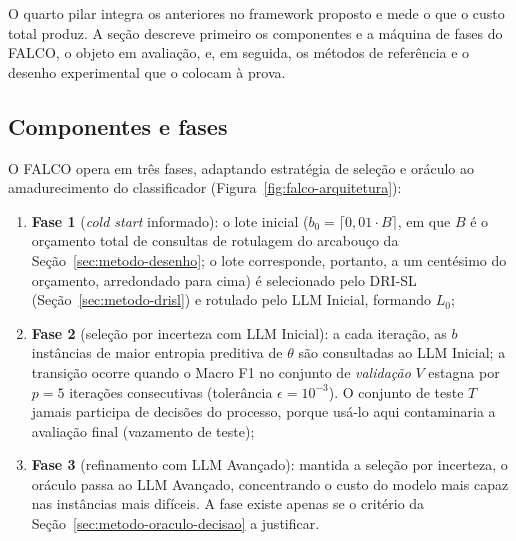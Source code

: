 O quarto pilar integra os anteriores no framework proposto e mede o que o
custo total produz. A seção descreve
primeiro os componentes e a máquina de fases do FALCO, o objeto em
avaliação, e, em seguida, os métodos de referência e o desenho experimental
que o colocam à prova.

\subsection{Componentes e fases}
\label{sec:metodo-falco-fases}

O FALCO opera em três fases, adaptando estratégia de seleção e oráculo ao
amadurecimento do classificador (Figura~\ref{fig:falco-arquitetura}):

\begin{enumerate}
  \item \textbf{Fase 1} (\textit{cold start} informado): o lote inicial
  ($b_0 = \lceil 0{,}01 \cdot B \rceil$, em que $B$ é o orçamento total de
  consultas de rotulagem do arcabouço da Seção~\ref{sec:metodo-desenho}; o
  lote corresponde, portanto, a um centésimo do orçamento, arredondado para
  cima) é selecionado pelo DRI-SL
  (Seção~\ref{sec:metodo-drisl}) e rotulado pelo LLM Inicial, formando $L_0$;
  \item \textbf{Fase 2} (seleção por incerteza com LLM Inicial): a cada iteração,
  as $b$ instâncias de maior entropia preditiva de $\theta$
  \citep{Settles2012} são consultadas ao LLM Inicial; a transição ocorre quando o
  Macro F1 no conjunto de \emph{validação} $V$ estagna por $p=5$ iterações
  consecutivas (tolerância $\epsilon = 10^{-3}$). O conjunto de teste $T$ jamais
  participa de decisões do processo, porque usá-lo aqui contaminaria a avaliação final
  (vazamento de teste);
  \item \textbf{Fase 3} (refinamento com LLM Avançado): mantida a seleção por
  incerteza, o oráculo passa ao LLM Avançado, concentrando o custo do modelo mais
  capaz nas instâncias mais difíceis. A fase existe apenas se o critério da
  Seção~\ref{sec:metodo-oraculo-decisao} a justificar.
\end{enumerate}

